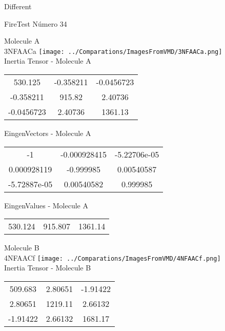 \begin{center}
\vtab
\vtab
\textcolor{NavyBlue}{\Large Different}
\end{center}

 \newpage

\vtab[-2cm]
\begin{center}
{\large FireTest \tab Número 34}
\end{center}
\begin{multicols}{2}
\begin{center}

Molecule A \\ 
3NFAACa
\texttt{[image: ../Comparations/ImagesFromVMD/3NFAACa.png]}
\\
Inertia Tensor - Molecule A \\
\vtab

\begin{tabular}{|c c c|}
530.125	 & 	-0.358211	 & 	-0.0456723	 \\
-0.358211	 & 	915.82	 & 	2.40736	 \\
-0.0456723	 & 	2.40736	 & 	1361.13
\end{tabular}

\vtab
 EingenVectors - Molecule A     \\
\vtab
\begin{tabular}{|c c c|}
-1	 & 	-0.000928415	 & 	-5.22706e-05	 \\
0.000928119	 & 	-0.999985	 & 	0.00540587	 \\
-5.72887e-05	 & 	0.00540582	 & 	0.999985
\end{tabular}

\vtab
 EingenValues - Molecule A     \\
\vtab
\begin{tabular}{|c c c|}
530.124	 & 	915.807	 & 	1361.14	 \\
\end{tabular}
\columnbreak

Molecule B \\ 
4NFAACf
\texttt{[image: ../Comparations/ImagesFromVMD/4NFAACf.png]}
\\
Inertia Tensor - Molecule B \\
\vtab

\begin{tabular}{|c c c|}
509.683	 & 	2.80651	 & 	-1.91422	 \\
2.80651	 & 	1219.11	 & 	2.66132	 \\
-1.91422	 & 	2.66132	 & 	1681.17
\end{tabular}


\end{center}
\end{multicols}
